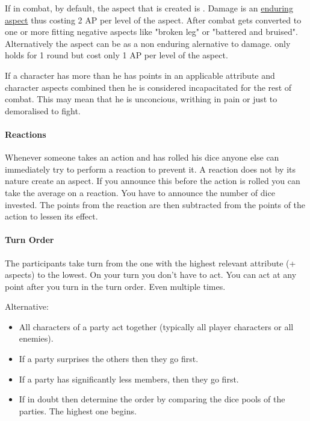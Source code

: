 \documentclass[11pt]{article}
\begin{document}
{If in combat, by default, the aspect that is created is . Damage is an \hyperref[sec:org38549a6]{enduring aspect} thus costing 2 AP per level of the aspect. After combat  gets converted to one or more fitting negative aspects like "broken leg" or "battered and bruised". 
Alternatively the aspect can be  as a non enduring alernative to damage.  only holds for 1 round but cost only 1 AP per level of the aspect.

If a character has more  than he has points in an applicable attribute and character aspects combined then he is considered incapacitated for the rest of combat. This may mean that he is unconcious, writhing in pain or just to demoralised to fight.

\paragraph*{Reactions}
\label{sec:orge8c5553}
Whenever someone takes an action and has rolled his dice anyone else can immediately try to perform a reaction to prevent it. A reaction does not by its nature create an aspect. If you announce this before the action is rolled you can take the average on a reaction. You have to announce the number of dice invested. The points from the reaction are then subtracted from the points of the action to lessen its effect.

\paragraph*{Turn Order}
\label{sec:orgaf01eb8}
The participants take turn from the one with the highest relevant attribute (+ aspects) to the lowest. On your turn you don't have to act. You can act at any point after you turn in the turn order. Even multiple times. 

Alternative:
\begin{itemize}
\item All characters of a party act together (typically all player characters or all enemies).
\item If a party surprises the others then they go first.
\item If a party has significantly less members, then they go first.
\item If in doubt then determine the order by comparing the dice pools of the parties. The highest one begins.
\end{itemize}

}
\end{document}
